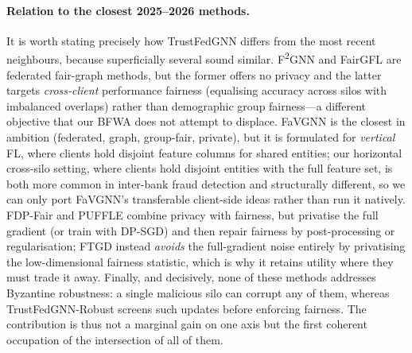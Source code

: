 \documentclass[pdflatex,sn-mathphys-num]{sn-jnl}
\theoremstyle{thmstyleone}%
\theoremstyle{thmstyletwo}%
\theoremstyle{thmstylethree}%
\begin{document}
\paragraph{Relation to the closest 2025--2026 methods.}
It is worth stating precisely how TrustFedGNN differs from the most recent
neighbours, because superficially several sound similar. F\textsuperscript{2}GNN
and FairGFL are federated fair-graph methods, but the former offers no privacy
and the latter targets \emph{cross-client} performance fairness (equalising
accuracy across silos with imbalanced overlaps) rather than demographic group
fairness---a different objective that our BFWA does not attempt to displace.
FaVGNN is the closest in ambition (federated, graph, group-fair, private), but
it is formulated for \emph{vertical} FL, where clients hold disjoint feature
columns for shared entities; our horizontal cross-silo setting, where clients
hold disjoint entities with the full feature set, is both more common in
inter-bank fraud detection and structurally different, so we can only port
FaVGNN's transferable client-side ideas rather than run it natively. FDP-Fair
and PUFFLE combine privacy with fairness, but privatise the full gradient (or
train with DP-SGD) and then repair fairness by post-processing or regularisation;
FTGD instead \emph{avoids} the full-gradient noise entirely by privatising the
low-dimensional fairness statistic, which is why it retains utility where they
must trade it away. Finally, and decisively, none of these methods addresses
Byzantine robustness: a single malicious silo can corrupt any of them, whereas
TrustFedGNN-Robust screens such updates before enforcing fairness. The
contribution is thus not a marginal gain on one axis but the first coherent
occupation of the intersection of all of them.
\end{document}
